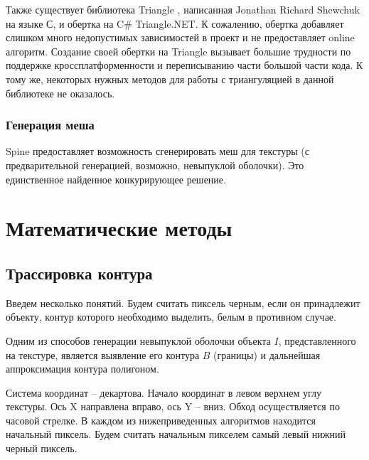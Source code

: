 \documentclass{fefu}
\begin{document}
Также существует библиотека Triangle \cite{TriangleSite}, написанная Jonathan Richard Shewchuk на языке С, и
обертка на C\# Triangle.NET. К сожалению, обертка добавляет слишком много недопустимых зависимостей в проект и не
предоставляет online алгоритм. Создание своей обертки на Triangle вызывает большие трудности по поддержке
кроссплатформенности и переписыванию части большой части кода. К тому же, некоторых нужных методов для работы с
триангуляцией в данной библиотеке не оказалось.
\subsubsection{Генерация меша}
Spine предоставляет возможность сгенерировать меш для текстуры (с предварительной генерацией, возможно, невыпуклой оболочки).
Это единственное найденное конкурирующее решение.
\section{Математические методы}
\subsection{Трассировка контура}
Введем несколько понятий. Будем считать пиксель черным, если он принадлежит объекту, контур которого необходимо выделить,
белым в противном случае.

Одним из способов генерации невыпуклой оболочки объекта $I$, представленного на текстуре, является выявление
его контура $B$ (границы) и дальнейшая аппроксимация контура полигоном.

Система координат -- декартова. Начало координат в левом верхнем углу текстуры. Ось X направлена вправо, ось Y -- вниз.
Обход осуществляется по часовой стрелке. В каждом из нижеприведенных алгоритмов находится начальный пиксель. Будем
считать начальным пикселем самый левый нижний черный пиксель.
\end{document}
